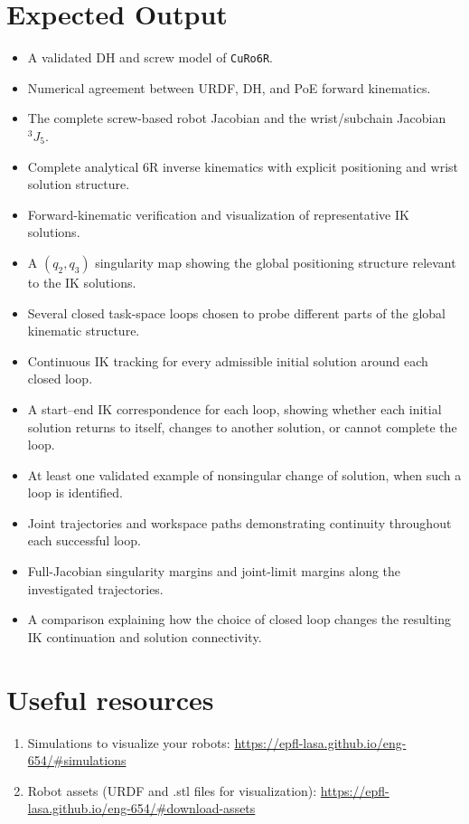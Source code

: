 \documentclass[11pt,a4paper]{article}
\begin{document}
\section*{Expected Output}
\begin{itemize}
  \item A validated DH and screw model of \texttt{CuRo6R}.
  \item Numerical agreement between URDF, DH, and PoE forward kinematics.
  \item The complete screw-based robot Jacobian and the wrist/subchain Jacobian $^{3}J_{5}$.
  \item Complete analytical 6R inverse kinematics with explicit positioning and wrist solution structure.
  \item Forward-kinematic verification and visualization of representative IK solutions.
  \item A $(q_2,q_3)$ singularity map showing the global positioning structure relevant to the IK solutions.
  \item Several closed task-space loops chosen to probe different parts of the global kinematic structure.
  \item Continuous IK tracking for every admissible initial solution around each closed loop.
  \item A start--end IK correspondence for each loop, showing whether each initial solution returns to itself, changes to another solution, or cannot complete the loop.
  \item At least one validated example of nonsingular change of solution, when such a loop is identified.
  \item Joint trajectories and workspace paths demonstrating continuity throughout each successful loop.
  \item Full-Jacobian singularity margins and joint-limit margins along the investigated trajectories.
  \item A comparison explaining how the choice of closed loop changes the resulting IK continuation and solution connectivity.
\end{itemize}

\section*{Useful resources}
\begin{enumerate}
	\item Simulations to visualize your robots: \url{https://epfl-lasa.github.io/eng-654/#simulations} 
	\item Robot assets (URDF and .stl files for visualization): \url{https://epfl-lasa.github.io/eng-654/#download-assets}
\end{enumerate}
\end{document}

